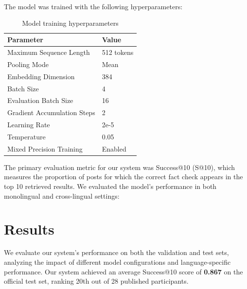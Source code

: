 \documentclass[11pt]{article}
\begin{document}
The model was trained with the following hyperparameters:

\begin{table}[h]
\centering
\small
\begin{tabular}{ll}
\hline
\textbf{Parameter} & \textbf{Value} \\
\hline
Maximum Sequence Length & 512 tokens \\
Pooling Mode & Mean \\
Embedding Dimension & 384 \\
Batch Size & 4 \\
Evaluation Batch Size & 16 \\
Gradient Accumulation Steps & 2 \\
Learning Rate & 2e-5 \\
Temperature & 0.05 \\
Mixed Precision Training & Enabled \\
\hline
\end{tabular}
\caption{Model training hyperparameters}
\label{tab:hyperparams}
\end{table}


The primary evaluation metric for our system was Success@10 (S@10), which measures the proportion of posts for which the correct fact check appears in the top 10 retrieved results. We evaluated the model's performance in both monolingual and cross-lingual settings:


\section{Results}

We evaluate our system's performance on both the validation and test sets, analyzing the impact of different model configurations and language-specific performance. Our system achieved an average Success@10 score of \textbf{0.867} on the official test set, ranking 20th out of 28 published participants.
\end{document}
